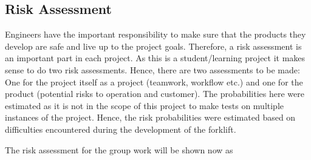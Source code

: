 \documentclass[../report.tex]{subfiles}
\begin{document}
\subsection{Risk Assessment}
Engineers have the important responsibility to make sure that the products
they develop are safe and live up to the project goals. Therefore, a
risk assessment is an important part in each project. As this is a student/learning
project it makes sense to do two risk assessments. Hence, there are two assessments to be made: 
One for the project itself as a project (teamwork, workflow etc.) and one for the product (potential risks to 
operation and customer). The probabilities here were estimated as it is not in the scope of 
this project to make tests on multiple instances of the project. Hence, the risk probabilities were estimated 
based on difficulties encountered during the development of the forklift.

The risk assessment for the group work will be shown now as  
\end{document}
